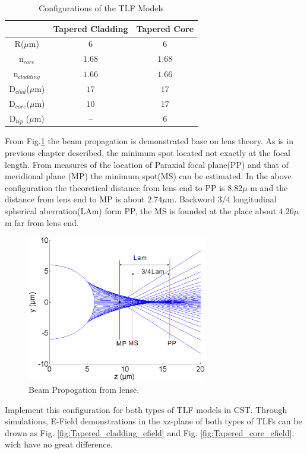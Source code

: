 \begin{table}
\caption{Configurations of the TLF Models}
\centering
\begin{tabular}{ccc}
\hline
							&Tapered Cladding&Tapered Core\\
\hline
R($\mu$m) & $6$						 &$6$	\\
n$_{core}$&$1.68$&$1.68$\\
n$_{cladding}$&$1.66$&$1.66$\\
D$_{clad}$($\mu$m) &	$17$ &	$17$\\
D$_{core}$($\mu$m) & $10$ &	$17$\\
D$_{tip}$ ($\mu$m) & --   &	$6$\\
\hline
\end{tabular}
\label{tab:model_fiber_configuration}
\end{table}
From Fig.\quad\ref{fig:lens_spot} the beam propagation is demonstrated base on lens theory. As is in previous chapter described, the minimum spot located not exactly at the focal length. From measures of the location of Paraxial focal plane(PP) and that of meridional plane (MP) the minimum spot(MS) can be estimated. In the above configuration the theoretical distance from lens end to PP is $8.82 \mu$ m and the distance from lens end to MP is about $2.74 \mu$m. Backword $3/4$ longitudinal spherical aberration(LAm) form PP, the MS is founded at the place about $4.26 \mu$m far from lens end. 
\begin{figure}[!ht]
\centering
	\includegraphics[width=0.7\textwidth]{bilder/cal_min_spot}
\caption{Beam Propogation from lense.}
\label{fig:lens_spot}
\end{figure}
Implement this configuration for both types of TLF models in CST. Through simulations, E-Field demonstrations in the xz-plane of both types of TLFs can be drown as Fig. \ref{fig:Tapered_cladding_efield} and  Fig. \ref{fig:Tapered_core_efield}, wich have no great difference.
